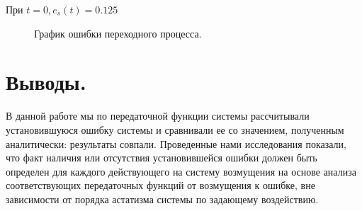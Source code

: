 \documentclass[a4paper, 11pt]{article}
\begin{document}
\normalsize{При $t=0, e_s(t)=0.125$}

\begin{figure}[h]
    \caption{График ошибки переходного процесса.}
    \label{tree}
\end{figure}
\newpage
\normalsize\section{{Выводы.}}
\normalsize{В данной работе мы по передаточной функции системы рассчитывали установившуюся ошибку системы и сравнивали ее со значением, полученным аналитически: результаты совпали. Проведенные нами исследования показали, что факт наличия или отсутствия установившейся ошибки должен быть определен для каждого действующего на систему возмущения на основе анализа соответствующих передаточных функций от возмущения к ошибке, вне зависимости от порядка астатизма системы по задающему воздействию.}
\end{document}
